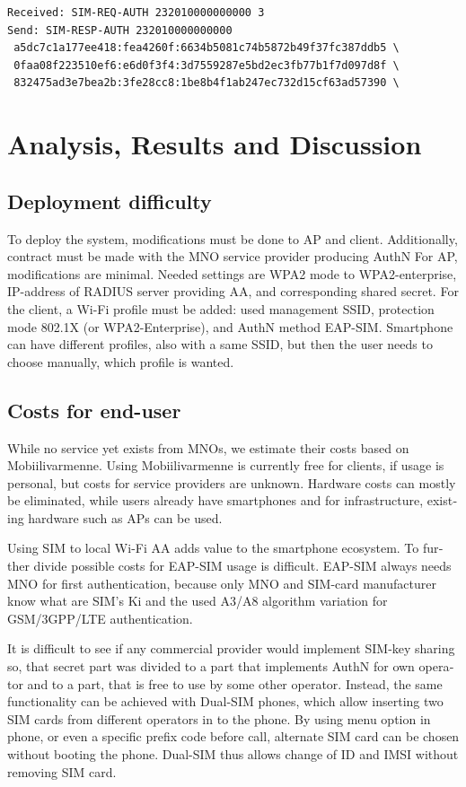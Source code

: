 \documentclass[12pt,a4paper,english]{tutthesis}
\begin{document}
\begin{otherlanguage}{english}
\scriptsize
\begin{verbatim}
Received: SIM-REQ-AUTH 232010000000000 3
Send: SIM-RESP-AUTH 232010000000000 
 a5dc7c1a177ee418:fea4260f:6634b5081c74b5872b49f37fc387ddb5 \
 0faa08f223510ef6:e6d0f3f4:3d7559287e5bd2ec3fb77b1f7d097d8f \
 832475ad3e7bea2b:3fe28cc8:1be8b4f1ab247ec732d15cf63ad57390 \
\end{verbatim}
\normalsize


\chapter{Analysis, Results and Discussion}
\label{sec-6}



\section{Deployment difficulty}
\label{sec-6-1}

To deploy the system, modifications must be done to AP and client.
Additionally, contract must be made with the MNO service
provider producing AuthN 
For AP, modifications are minimal. Needed settings are
WPA2 mode to WPA2-enterprise, IP-address of RADIUS server providing 
AA, and corresponding shared secret.
For  the client, a Wi-Fi profile must be added: used management SSID,
protection mode 802.1X (or WPA2-Enterprise), and AuthN method EAP-SIM.
Smartphone can have different profiles, also with a same SSID, but
then the user needs to choose manually, which profile is wanted.

\section{Costs for end-user}
\label{sec-6-2}
While no service yet exists from MNOs, we estimate their costs based
on Mobiilivarmenne. Using Mobiilivarmenne is currently free for
clients, if usage is personal, but costs for service providers are
unknown.  Hardware costs can mostly be eliminated, while users already
have smartphones and for infrastructure, existing hardware such as APs
can be used.

Using SIM to local Wi-Fi AA adds value to the smartphone ecosystem.
To further divide possible costs for EAP-SIM usage
is difficult.
EAP-SIM always needs MNO for first authentication,
because only MNO and SIM-card manufacturer know 
what are SIM's Ki and the used A3/A8 algorithm variation
for GSM/3GPP/LTE authentication.

It is difficult to see if any commercial provider would implement
SIM-key sharing so, that secret part was divided to a part that
implements AuthN for own operator and to a part, that is free to use by
some other operator.  Instead, the same functionality can be achieved with
Dual-SIM phones, which allow inserting two SIM cards from different
operators in to the phone. By using menu option in phone, or even a
specific prefix code before call, alternate SIM card can be chosen
without booting the phone.
Dual-SIM thus allows change of ID and IMSI without removing SIM card.


\end{otherlanguage}
\end{document}
